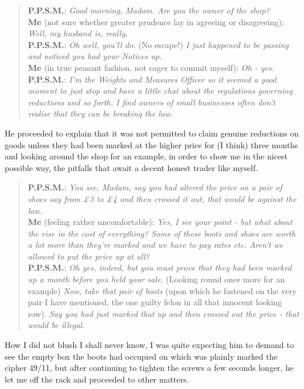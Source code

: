 \begin{quote}
\textbf{P.P.S.M.}: \textit{Good morning, Madam. Are you the owner of the shop?} \\
\textbf{Me} (not sure whether greater prudence lay in agreeing or disagreeing):  \textit{Well, my husband is, really.} \\
\textbf{P.P.S.M.}: \textit{Oh well, you’ll do.} (No escape!) \textit{I just happened to be passing and noticed you had your  Notices up}. \\
\textbf{Me} (in true peasant fashion, not eager to commit myself): \textit{Oh - yes}. \\
\textbf{P.P.S.M.}:  \textit{I'm the Weights and Measures Officer so it seemed a good moment to just stop and have a little chat about the regulations governing reductions and so forth. I find owners of small businesses often don’t realise that they can be breaking the law.} 
\end{quote}

He proceeded to explain that it was not permitted to claim genuine reductions on goods unless they had been marked at the higher price for (I think) three months and looking around the shop for an example, in order to show me in the nicest possible way, the pitfalls that await a decent honest trader like myself.

\begin{quote}
\textbf{P.P.S.M.}:  \textit{You see, Madam, say you had altered the price on a pair of shoes say from £3 to £4 and then crossed it out, that would be against the law.} \\
\textbf{Me}  (feeling rather uncomfortable): \textit{Yes, I see your point - but what about the rise in the cost of everything? Some of these boots and shoes are worth a lot more than they’re marked and we have to pay rates etc. Aren’t we allowed to put the price up at all?} \\
\textbf{P.P.S.M.}: \textit{Oh yes, indeed, but you must prove that they had been marked up a month before you held your sale.} (Looking round once more for an example) \textit{Now, take that pair of boots} (upon which he fastened on the very pair I have mentioned, the one guilty felon in all that innocent looking row). \textit{Say you had just marked that up and then crossed out the price - that would be illegal.}
\end{quote}

How I did not blush I shall never know, I was quite expecting him to demand to see the empty box the boots had occupied on which was plainly marked the cipher 49/11, but after continuing to tighten the screws a few seconds longer, he let me off the rack and proceeded to other matters.

